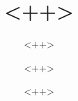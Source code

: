 \documentclass[a4paper, headsepline]{scrreprt}
\begin{document}
\title{<++>}					%
\subtitle{<++>}					%
\author{<++>}					%
\publishers{<++>}				%
\date{<++>}					%

\maketitle						%
\tableofcontents					%

\end{document}
